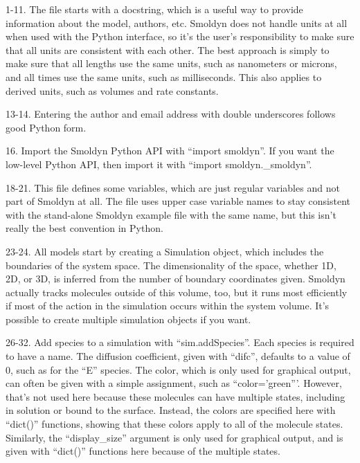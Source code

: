 \documentclass {scrbook}
\begin{document}
\begin{description}

\item{1-11.} The file starts with a docstring, which is a useful way to provide information about the model, authors, etc. Smoldyn does not handle units at all when used with the Python interface, so it's the user's responsibility to make sure that all units are consistent with each other. The best approach is simply to make sure that all lengths use the same units, such as nanometers or microns, and all times use the same units, such as milliseconds. This also applies to derived units, such as volumes and rate constants.

\item{13-14.} Entering the author and email address with double underscores follows good Python form.

\item{16.} Import the Smoldyn Python API with ``import smoldyn''. If you want the low-level Python API, then import it with ``import smoldyn.\_smoldyn''.

\item{18-21.} This file defines some variables, which are just regular variables and not part of Smoldyn at all. The file uses upper case variable names to stay consistent with the stand-alone Smoldyn example file with the same name, but this isn't really the best convention in Python.

\item{23-24.} All models start by creating a Simulation object, which includes the boundaries of the system space. The dimensionality of the space, whether 1D, 2D, or 3D, is inferred from the number of boundary coordinates given. Smoldyn actually tracks molecules outside of this volume, too, but it runs most efficiently if most of the action in the simulation occurs within the system volume. It's possible to create multiple simulation objects if you want.

\item{26-32.} Add species to a simulation with ``sim.addSpecies''. Each species is required to have a name. The diffusion coefficient, given with ``difc'', defaults to a value of 0, such as for the ``E'' species. The color, which is only used for graphical output, can often be given with a simple assignment, such as ``color='green'''. However, that's not used here because these molecules can have multiple states, including in solution or bound to the surface. Instead, the colors are specified here with ``dict()'' functions, showing that these colors apply to all of the molecule states. Similarly, the ``display\_size'' argument is only used for graphical output, and is given with ``dict()'' functions here because of the multiple states.


\end{description}
\end{document}
